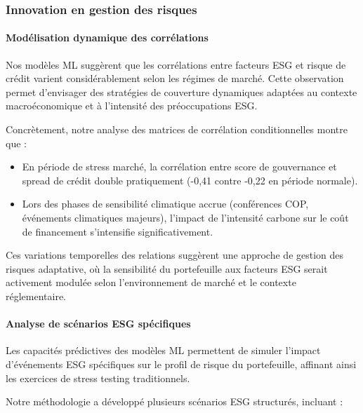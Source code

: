 \subsubsection{Innovation en gestion des risques}

\paragraph{Modélisation dynamique des corrélations}

Nos modèles ML suggèrent que les corrélations entre facteurs ESG et risque de crédit varient considérablement selon les régimes de marché. Cette observation permet d'envisager des stratégies de couverture dynamiques adaptées au contexte macroéconomique et à l'intensité des préoccupations ESG.

Concrètement, notre analyse des matrices de corrélation conditionnelles montre que :
\begin{itemize}
    \item En période de stress marché, la corrélation entre score de gouvernance et spread de crédit double pratiquement (-0,41 contre -0,22 en période normale).
    \item Lors des phases de sensibilité climatique accrue (conférences COP, événements climatiques majeurs), l'impact de l'intensité carbone sur le coût de financement s'intensifie significativement.
\end{itemize}

Ces variations temporelles des relations suggèrent une approche de gestion des risques adaptative, où la sensibilité du portefeuille aux facteurs ESG serait activement modulée selon l'environnement de marché et le contexte réglementaire.

\paragraph{Analyse de scénarios ESG spécifiques}

Les capacités prédictives des modèles ML permettent de simuler l'impact d'événements ESG spécifiques sur le profil de risque du portefeuille, affinant ainsi les exercices de stress testing traditionnels.

Notre méthodologie a développé plusieurs scénarios ESG structurés, incluant :

